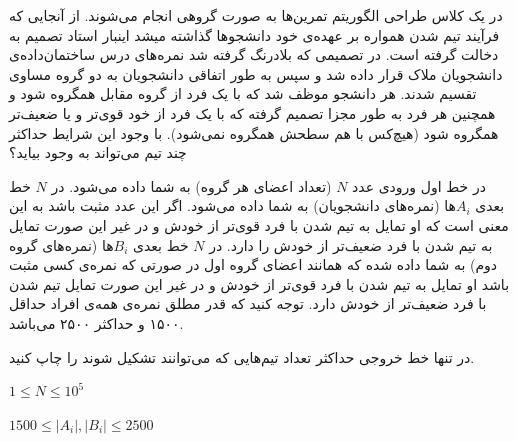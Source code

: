 \documentclass[11.5pt,a4paper,oneside]{article}
\begin{document}
\def\problemCode{Realtime}
\def\problemEnglishTitle{Realtime Teammate}
\def\problemFarsiTitle{همگروهی بلادرنگ}
\def\timeLimit{$1$ \second}
\def\memLimit{$32$ \megabytes}
\begin{problem}
در یک کلاس طراحی الگوریتم تمرین‌ها به صورت گروهی انجام می‌شوند. از آنجایی که فرآیند تیم شدن همواره بر عهده‌ی خود دانشجو‌ها گذاشته میشد اینبار استاد تصمیم به دخالت گرفته است. در تصمیمی که بلادرنگ گرفته شد نمره‌های درس ساختمان‌داده‌ی دانشجویان ملاک قرار داده شد و سپس به طور اتفاقی دانشجویان به دو گروه مساوی تقسیم شدند. هر دانشجو موظف شد که با یک فرد از گروه مقابل همگروه شود و همچنین هر فرد به طور مجزا تصمیم گرفته که با یک فرد از خود قوی‌تر و یا ضعیف‌تر همگروه شود (هیچ‌کس با هم سطحش همگروه نمی‌شود). با وجود این شرایط حداکثر چند تیم می‌تواند به وجود بیاید؟

در خط اول ورودی عدد $N$ (تعداد اعضای هر گروه) به شما داده می‌شود. 
در $N$ خط بعدی $A_i$ها (نمره‌های دانشجویان) به شما داده می‌شود. اگر این عدد مثبت باشد به این معنی است که او تمایل به تیم شدن با فرد قوی‌تر از خودش و در غیر این صورت تمایل به تیم شدن با فرد ضعیف‌تر از خودش را دارد. در $N$ خط بعدی  $B_i$ها (نمره‌های گروه دوم) به شما داده شده که همانند اعضای گروه اول در صورتی که نمره‌ی کسی مثبت باشد او تمایل به تیم شدن با فرد قوی‌تر از خودش و در غیر این صورت تمایل تیم شدن با فرد ضعیف‌تر از خودش دارد.
توجه کنید که قدر مطلق نمره‌ی همه‌ی افراد حداقل ۱۵۰۰ و حداکثر ۲۵۰۰ می‌باشد.

\outputDescription
در تنها خط خروجی حداکثر تعداد تیم‌هایی که می‌توانند تشکیل شوند را چاپ کنید.
\constraints
\begin{shortitems}
\item $1 \le N \le 10^5$
\item $1500 \le |A_i|, |B_i| \le 2500$
\end{shortitems}

\sampleIO

\begin{example}
%
%
%
\end{example}



\end{problem}
\end{document}
